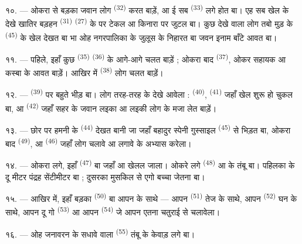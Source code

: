 १०. --- ओकरा से बड़का जवान लोग 
\textsuperscript{(32)} करत बाड़ें, आ ई सब 
\textsuperscript{(33)} लगे होत बा। एह सब खेल के
देखे खातिर बड़हन  \textsuperscript{(31)} 
\textsuperscript{(27)} के  पर टेकल आ किनारा पर जुटल बा।
कुछ देखे वाला लोग तबो मुड़ के 
\textsuperscript{(45)} के खेल देखत बा भा ओह नगरपालिका के जुलूस के
निहारत बा जवन इनाम बाँटे आवत बा।

११. --- पहिले, इहाँ कुछ  \textsuperscript{(35)}
 \textsuperscript{(36)} के आगे-आगे चलत बाड़ें ; ओकरा बाद
 \textsuperscript{(37)}, ओकर सहायक आ कस्बा के
 आवत बाड़ें। आखिर में 
\textsuperscript{(38)} लोग चलत बाड़ें।

\VUsaut{5.0mm}
\VUsaut{3.6mm}

१२. ---  \textsuperscript{(39)} पर बहुते भीड़ बा।
लोग तरह-तरह के  देखे आवेला : 
\textsuperscript{(40)},  \textsuperscript{(41)} जहाँ खेल
शुरू हो चुकल बा, आ  \textsuperscript{(42)} जहाँ
सहर के जवान लइका आ लइकी लोग  के मजा लेत बाड़ें।

१३. --- छोर पर हमनी के  \textsuperscript{(44)} देखत बानी
जा जहाँ बहादुर स्पेनी  गुस्साइल 
\textsuperscript{(45)} से भिड़त बा, ओकरा बाद 
\textsuperscript{(49)}, आ  \textsuperscript{(46)}
जहाँ लोग  चलावे आ  लगावे के अभ्यास करेला।

१४. --- ओकरा लगे, इहाँ  \textsuperscript{(47)}
बा जहाँ  आ  खेलल जाला। ओकरे लगे
 \textsuperscript{(48)} आ  के तंबू बा।
पहिलका के  दू मीटर पंद्रह सेंटीमीटर बा ; दुसरका मुसकिल से
एगो बच्चा जेतना बा।

१५. --- आखिर में, इहाँ बड़का  \textsuperscript{(50)}
बा आपन  के साथे — आपन 
\textsuperscript{(51)} तेज  के साथे, आपन 
\textsuperscript{(52)} घन  के साथे, आपन दू गो
 \textsuperscript{(53)} आ आपन 
\textsuperscript{(54)} जे आपन  एतना चतुराई से चलावेला।

१६. --- ओह जनावरन के सधावे वाला 
\textsuperscript{(55)} तंबू के केवाड़ लगे बा।
